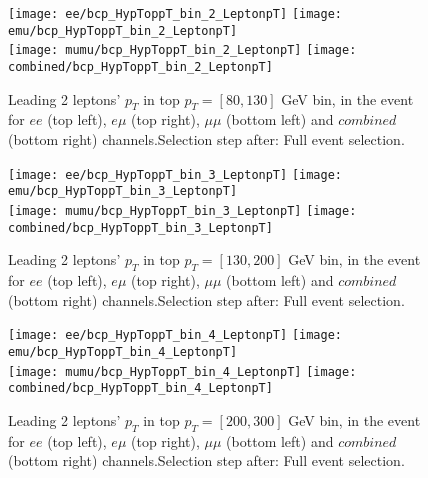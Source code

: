 \clearpage
\newpage


\begin{figure}
  \texttt{[image: ee/bcp\_HypToppT\_bin\_2\_LeptonpT]}
  \texttt{[image: emu/bcp\_HypToppT\_bin\_2\_LeptonpT]}\\
  \texttt{[image: mumu/bcp\_HypToppT\_bin\_2\_LeptonpT]}
  \texttt{[image: combined/bcp\_HypToppT\_bin\_2\_LeptonpT]}
\caption{Leading 2 leptons' $p_T$ in top $p_T = [80,130]$ GeV bin, in the event for $ee$ (top left), $e\mu$ (top right), $\mu\mu$ (bottom left) and $combined$ (bottom right) channels.\newline Selection step after: Full event selection.}
\end{figure}

\clearpage
\newpage


\begin{figure}
  \texttt{[image: ee/bcp\_HypToppT\_bin\_3\_LeptonpT]}
  \texttt{[image: emu/bcp\_HypToppT\_bin\_3\_LeptonpT]}\\
  \texttt{[image: mumu/bcp\_HypToppT\_bin\_3\_LeptonpT]}
  \texttt{[image: combined/bcp\_HypToppT\_bin\_3\_LeptonpT]}
\caption{Leading 2 leptons' $p_T$ in top $p_T = [130,200]$ GeV bin, in the event for $ee$ (top left), $e\mu$ (top right), $\mu\mu$ (bottom left) and $combined$ (bottom right) channels.\newline Selection step after: Full event selection.}
\end{figure}

\clearpage
\newpage

\begin{figure}
  \texttt{[image: ee/bcp\_HypToppT\_bin\_4\_LeptonpT]}
  \texttt{[image: emu/bcp\_HypToppT\_bin\_4\_LeptonpT]}\\
  \texttt{[image: mumu/bcp\_HypToppT\_bin\_4\_LeptonpT]}
  \texttt{[image: combined/bcp\_HypToppT\_bin\_4\_LeptonpT]}
\caption{Leading 2 leptons' $p_T$ in top $p_T = [200,300]$ GeV bin, in the event for $ee$ (top left), $e\mu$ (top right), $\mu\mu$ (bottom left) and $combined$ (bottom right) channels.\newline Selection step after: Full event selection.}
\end{figure}

\clearpage
\newpage


